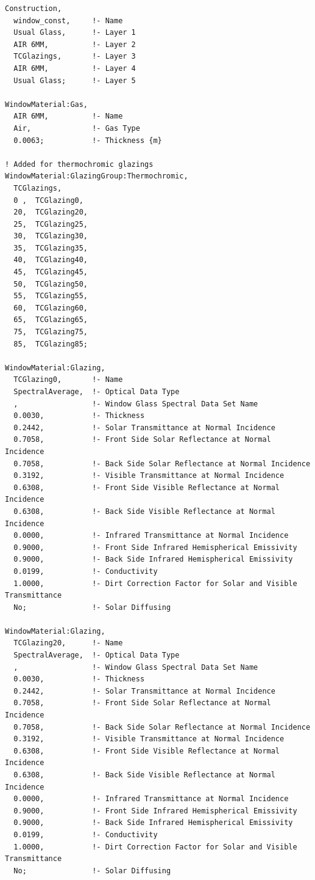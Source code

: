 \begin{lstlisting}
Construction,
  window_const,     !- Name
  Usual Glass,      !- Layer 1
  AIR 6MM,          !- Layer 2
  TCGlazings,       !- Layer 3
  AIR 6MM,          !- Layer 4
  Usual Glass;      !- Layer 5

WindowMaterial:Gas,
  AIR 6MM,          !- Name
  Air,              !- Gas Type
  0.0063;           !- Thickness {m}

! Added for thermochromic glazings
WindowMaterial:GlazingGroup:Thermochromic,
  TCGlazings,
  0 ,  TCGlazing0,
  20,  TCGlazing20,
  25,  TCGlazing25,
  30,  TCGlazing30,
  35,  TCGlazing35,
  40,  TCGlazing40,
  45,  TCGlazing45,
  50,  TCGlazing50,
  55,  TCGlazing55,
  60,  TCGlazing60,
  65,  TCGlazing65,
  75,  TCGlazing75,
  85,  TCGlazing85;

WindowMaterial:Glazing,
  TCGlazing0,       !- Name
  SpectralAverage,  !- Optical Data Type
  ,                 !- Window Glass Spectral Data Set Name
  0.0030,           !- Thickness
  0.2442,           !- Solar Transmittance at Normal Incidence
  0.7058,           !- Front Side Solar Reflectance at Normal Incidence
  0.7058,           !- Back Side Solar Reflectance at Normal Incidence
  0.3192,           !- Visible Transmittance at Normal Incidence
  0.6308,           !- Front Side Visible Reflectance at Normal Incidence
  0.6308,           !- Back Side Visible Reflectance at Normal Incidence
  0.0000,           !- Infrared Transmittance at Normal Incidence
  0.9000,           !- Front Side Infrared Hemispherical Emissivity
  0.9000,           !- Back Side Infrared Hemispherical Emissivity
  0.0199,           !- Conductivity
  1.0000,           !- Dirt Correction Factor for Solar and Visible Transmittance
  No;               !- Solar Diffusing

WindowMaterial:Glazing,
  TCGlazing20,      !- Name
  SpectralAverage,  !- Optical Data Type
  ,                 !- Window Glass Spectral Data Set Name
  0.0030,           !- Thickness
  0.2442,           !- Solar Transmittance at Normal Incidence
  0.7058,           !- Front Side Solar Reflectance at Normal Incidence
  0.7058,           !- Back Side Solar Reflectance at Normal Incidence
  0.3192,           !- Visible Transmittance at Normal Incidence
  0.6308,           !- Front Side Visible Reflectance at Normal Incidence
  0.6308,           !- Back Side Visible Reflectance at Normal Incidence
  0.0000,           !- Infrared Transmittance at Normal Incidence
  0.9000,           !- Front Side Infrared Hemispherical Emissivity
  0.9000,           !- Back Side Infrared Hemispherical Emissivity
  0.0199,           !- Conductivity
  1.0000,           !- Dirt Correction Factor for Solar and Visible Transmittance
  No;               !- Solar Diffusing


\end{lstlisting}
